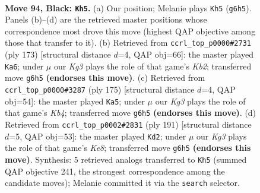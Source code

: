 \documentclass[11pt]{article}
\begin{document}
\clearpage

\begin{figure}[p]\centering
\begin{subfigure}{0.46\textwidth}\centering
\resizebox{\linewidth}{!}{%
\newchessgame
\chessboard[
  setfen={8/8/1R4k1/8/8/7K/5p2/3r4 b - - 3 94},
  showmover=false,
  pgfstyle=straightmove, color=movearrow, markmove={g6-h5}
]}
\caption{}
\end{subfigure}\hfill
\begin{subfigure}{0.46\textwidth}\centering
\resizebox{\linewidth}{!}{%
\newchessgame
\chessboard[
  setfen={8/1k4R1/8/7p/1K5P/8/8/4r3 b - - 12 87},
  showmover=false,
  pgfstyle=straightmove, color=movearrow, markmove={b7-a6}
]}
\caption{}
\end{subfigure}
\\[4pt]
\begin{subfigure}{0.46\textwidth}\centering
\resizebox{\linewidth}{!}{%
\newchessgame
\chessboard[
  setfen={8/8/3r4/1k6/8/4p1K1/4P3/1R6 b - - 19 88},
  showmover=false,
  pgfstyle=straightmove, color=movearrow, markmove={b5-a5}
]}
\caption{}
\end{subfigure}\hfill
\begin{subfigure}{0.46\textwidth}\centering
\resizebox{\linewidth}{!}{%
\newchessgame
\chessboard[
  setfen={8/7r/8/8/4p3/4P3/6K1/R3k3 b - - 13 96},
  showmover=false,
  pgfstyle=straightmove, color=movearrow, markmove={e1-d2}
]}
\caption{}
\end{subfigure}
\caption{\textbf{Move 94, Black: \texttt{Kh5}.} (a) Our position; Melanie plays \texttt{Kh5} (\texttt{g6h5}). Panels (b)--(d) are the retrieved master positions whose correspondence most drove this move (highest QAP objective among those that transfer to it). (b) Retrieved from \texttt{ccrl\_top\_p0000\#2731} (ply 173) [structural distance $d$=4, QAP obj=66]: the master played \texttt{Ka6}; under $\mu$ our \emph{Kg3} plays the role of that game's \emph{Kb2}; transferred move \texttt{g6h5} \textbf{(endorses this move)}. (c) Retrieved from \texttt{ccrl\_top\_p0000\#3287} (ply 175) [structural distance $d$=4, QAP obj=54]: the master played \texttt{Ka5}; under $\mu$ our \emph{Kg3} plays the role of that game's \emph{Kb4}; transferred move \texttt{g6h5} \textbf{(endorses this move)}. (d) Retrieved from \texttt{ccrl\_top\_p0002\#2831} (ply 191) [structural distance $d$=5, QAP obj=53]: the master played \texttt{Kd2}; under $\mu$ our \emph{Kg3} plays the role of that game's \emph{Ke8}; transferred move \texttt{g6h5} \textbf{(endorses this move)}. Synthesis: 5 retrieved analogs transferred to \texttt{Kh5} (summed QAP objective 241, the strongest correspondence among the candidate moves); Melanie committed it via the \texttt{search} selector.}
\label{fig:thought-m187}
\end{figure}
\end{document}
